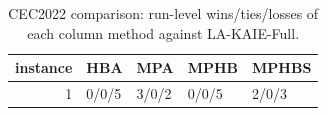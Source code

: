 \begin{table}[t]
\centering
\scriptsize
\caption{CEC2022 comparison: run-level wins/ties/losses of each column method against LA-KAIE-Full.}
\label{tab:cec2022_comparison_wtl}
\begin{tabular}{rllll}
\toprule
instance & HBA & MPA & MPHB & MPHBS \\
\midrule
1 & 0/0/5 & 3/0/2 & 0/0/5 & 2/0/3 \\
\bottomrule
\end{tabular}
\end{table}
